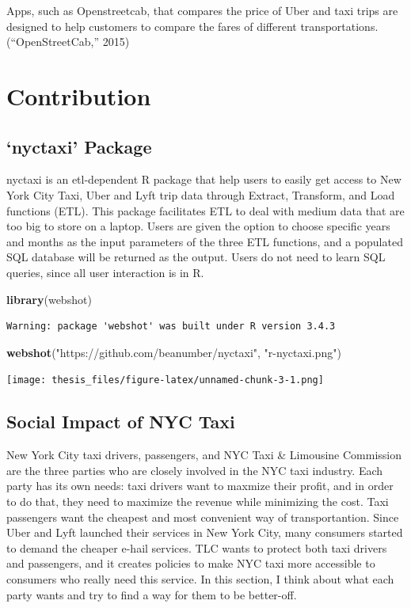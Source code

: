 \documentclass[12pt,twoside]{reedthesis}
\newenvironment{Shaded}{\begin{snugshade}}{\end{snugshade}}
\newcommand{\KeywordTok}[1]{\textcolor[rgb]{0.13,0.29,0.53}{\textbf{#1}}}
\newcommand{\StringTok}[1]{\textcolor[rgb]{0.31,0.60,0.02}{#1}}
\newcommand{\NormalTok}[1]{#1}
\theoremstyle{definition}
\theoremstyle{definition}
\theoremstyle{definition}
\theoremstyle{remark}
\begin{document}
Apps, such as Openstreetcab, that compares the price of Uber and taxi
trips are designed to help customers to compare the fares of different
transportations. (``OpenStreetCab,'' 2015)

\section{Contribution}\label{contribution}

\subsection{\texorpdfstring{`nyctaxi'
Package}{nyctaxi Package}}\label{nyctaxi-package}

nyctaxi is an etl-dependent R package that help users to easily get
access to New York City Taxi, Uber and Lyft trip data through Extract,
Transform, and Load functions (ETL). This package facilitates ETL to
deal with medium data that are too big to store on a laptop. Users are
given the option to choose specific years and months as the input
parameters of the three ETL functions, and a populated SQL database will
be returned as the output. Users do not need to learn SQL queries, since
all user interaction is in R.
\begin{Shaded}
\begin{Highlighting}[]
\KeywordTok{library}\NormalTok{(webshot)}
\end{Highlighting}
\end{Shaded}
\begin{verbatim}
Warning: package 'webshot' was built under R version 3.4.3
\end{verbatim}
\begin{Shaded}
\begin{Highlighting}[]
\KeywordTok{webshot}\NormalTok{(}\StringTok{"https://github.com/beanumber/nyctaxi"}\NormalTok{, }\StringTok{"r-nyctaxi.png"}\NormalTok{)}
\end{Highlighting}
\end{Shaded}
\texttt{[image: thesis\_files/figure-latex/unnamed-chunk-3-1.png]}

\subsection{Social Impact of NYC Taxi}\label{social-impact-of-nyc-taxi}

New York City taxi drivers, passengers, and NYC Taxi \& Limousine
Commission are the three parties who are closely involved in the NYC
taxi industry. Each party has its own needs: taxi drivers want to
maxmize their profit, and in order to do that, they need to maximize the
revenue while minimizing the cost. Taxi passengers want the cheapest and
most convenient way of transportantion. Since Uber and Lyft launched
their services in New York City, many consumers started to demand the
cheaper e-hail services. TLC wants to protect both taxi drivers and
passengers, and it creates policies to make NYC taxi more accessible to
consumers who really need this service. In this section, I think about
what each party wants and try to find a way for them to be better-off.
\end{document}
